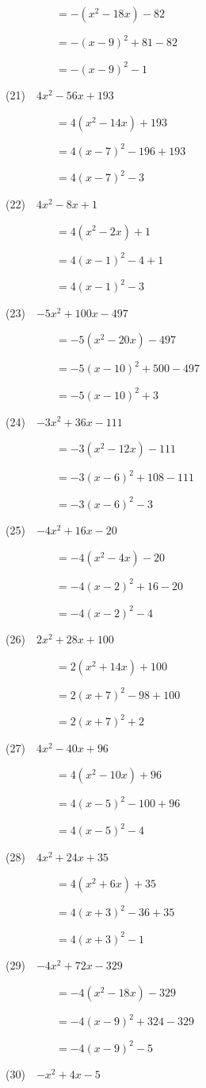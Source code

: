 \documentclass[a4j,twocolumn,10pt,fleqn]{jarticle}
\begin{document}
~~~~~~~~~$=-(x^2-18x)-82$

~~~~~~~~~$=-(x-9)^2 +81-82$

~~~~~~~~~$=-(x-9)^2-1$

(21)~~$4x^2-56x +193$

~~~~~~~~~$=4(x^2-14x) +193$

~~~~~~~~~$=4(x-7)^2-196+193$

~~~~~~~~~$=4(x-7)^2-3$

(22)~~$4x^2-8x +1$

~~~~~~~~~$=4(x^2-2x) +1$

~~~~~~~~~$=4(x-1)^2-4+1$

~~~~~~~~~$=4(x-1)^2-3$

(23)~~$-5x^2 +100x-497$

~~~~~~~~~$=-5(x^2-20x)-497$

~~~~~~~~~$=-5(x-10)^2 +500-497$

~~~~~~~~~$=-5(x-10)^2 +3$

(24)~~$-3x^2 +36x-111$

~~~~~~~~~$=-3(x^2-12x)-111$

~~~~~~~~~$=-3(x-6)^2 +108-111$

~~~~~~~~~$=-3(x-6)^2-3$

(25)~~$-4x^2 +16x-20$

~~~~~~~~~$=-4(x^2-4x)-20$

~~~~~~~~~$=-4(x-2)^2 +16-20$

~~~~~~~~~$=-4(x-2)^2-4$

(26)~~$2x^2 +28x +100$

~~~~~~~~~$=2(x^2 +14x) +100$

~~~~~~~~~$=2(x +7)^2-98+100$

~~~~~~~~~$=2(x +7)^2 +2$

(27)~~$4x^2-40x +96$

~~~~~~~~~$=4(x^2-10x) +96$

~~~~~~~~~$=4(x-5)^2-100+96$

~~~~~~~~~$=4(x-5)^2-4$

(28)~~$4x^2 +24x +35$

~~~~~~~~~$=4(x^2 +6x) +35$

~~~~~~~~~$=4(x +3)^2-36+35$

~~~~~~~~~$=4(x +3)^2-1$

(29)~~$-4x^2 +72x-329$

~~~~~~~~~$=-4(x^2-18x)-329$

~~~~~~~~~$=-4(x-9)^2 +324-329$

~~~~~~~~~$=-4(x-9)^2-5$

(30)~~$-x^2 +4x-5$
\end{document}
